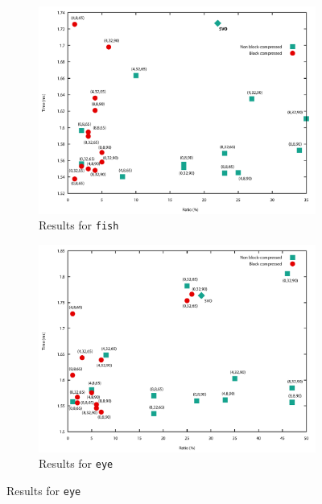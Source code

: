 \begin{figure}[h]
\centering
\begin{subfigure}{\textwidth}
    \centering
    \includegraphics[width=\textwidth]{results/fish-time-ratio.pdf} 
    \caption{Results for \texttt{fish}}
    \label{fig:fish-time-ratio}
\end{subfigure}

\begin{subfigure}{\textwidth}
\centering
    \includegraphics[width=\textwidth]{results/eye-time-ratio.pdf} 
    \caption{Results for \texttt{eye}}
    \label{fig:eye-ratio}
\end{subfigure}

\label{fig:results-time-ratio}

\end{figure}


